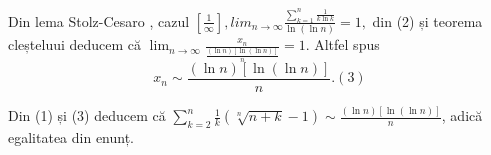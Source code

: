 \documentclass[a4paper,12pt,oneside]{report}
\begin{document}
Din lema Stolz-Cesaro , cazul \(\left [ \frac{1}{\infty } \right ], lim_{n \to \infty }\frac{\sum_{k=1}^{n}\frac{1}{k\ln k}}{\ln\left ( \ln n \right ) } = 1,\) din (2) și teorema cleșteluui deducem că \(\lim_{n \to \infty }\frac{x_{n}}{\frac{\left ( \ln n  \right )\left [ \ln\left ( \ln n \right ) \right ]}{n}} = 1\). Altfel spus 
\begin{displaymath}
  x_{n}\sim \frac{\left ( \ln n \right )\left [ \ln\left ( \ln n \right ) \right ]}{n}. (3)
\end{displaymath}

Din (1) și (3) deducem că \(\sum_{k=2}^{n}\frac{1}{k}\left ( \sqrt[n]{n+k}-1 \right )\sim \frac{\left ( \ln n \right )\left [ \ln\left ( \ln n \right ) \right ]}{n}\), adică egalitatea din enunț. \cite{dumitru}



\setlength{\baselineskip}{\normalbaselineskip}
\setlength{\parskip}{0pt}

\end{document}
